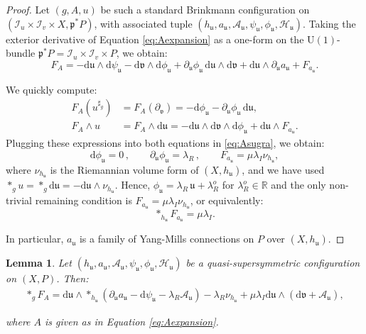 \documentclass[10pt,a4paper,twoside,reqno]{amsart}
\theoremstyle{plain}
\newtheorem{lemma}[thm]{Lemma}
\theoremstyle{definition}
\theoremstyle{remark}
\def\R{\mathbb{R}}
\def\dd{\mathrm{d}}
\def\cH{\mathcal{H}}
\def\U{\mathrm{U}}
\def\cA{\mathcal{A}}
\def\cI{\mathcal{I}}
\def\R{\mathbb{R}}
\def\cH{\mathcal{H}}
\def\dd{\mathrm{d}}
\def\fru{\mathfrak{u}}
\def\frv{\mathfrak{v}}
\begin{document}
\begin{proof}
Let $(g,A,u)$ be such a standard Brinkmann configuration on $(\cI_u\times \cI_v \times X, \mathfrak{p}^{\ast}P)$, with associated tuple $(h_{\fru}, a_{\fru}, \cA_{\fru}, \psi_{\fru}, \phi_{\fru}, \cH_{\fru})$. Taking the exterior derivative of Equation \eqref{eq:Aexpansion} as a one-form on the $\U(1)$-bundle $\mathfrak{p}^{\ast}P = \cI_u\times \cI_v \times P$, we obtain:
\begin{equation*}
F_A =  - \dd \fru \wedge \dd\psi_{\fru}  -  \dd \frv\wedge \dd\phi_{\fru} + \partial_{\fru} \phi_{\fru}\, \dd \fru\wedge  \dd \frv + \dd \fru \wedge \partial_{\fru} a_{\fru} + F_{a_{\fru}}.
\end{equation*}

\noindent
We quickly compute:
\begin{align*}
F_A(u^{\sharp_g}) &= F_A(\partial_{\frv}) = - \dd \phi_{\fru} - \partial_{\fru}\phi_{\fru} \, \dd \fru,\\
F_A \wedge u &= F_A\wedge \dd \fru = -\dd \fru\wedge \dd \frv \wedge \dd \phi_{\fru} + \dd \fru \wedge F_{a_{\fru}}.
\end{align*}
Plugging these expressions into both equations in \eqref{eq:Asugra}, we obtain:
\begin{equation*}
\dd \phi_{\fru} = 0\, , \qquad \partial_{\fru}\phi_{\fru} = \lambda_R\, , \qquad F_{a_{\fru}} = \mu \lambda_I \nu_{h_{\fru}},
\end{equation*}
where $\nu_{h_{\fru}}$ is the Riemannian volume form of $(X,h_{\fru})$, and we have used $\ast_g u = \ast_g \dd \fru = - \dd \fru \wedge \nu_{h_{\fru}}$. Hence, $\phi_{\fru} = \lambda_R \, \fru + \lambda_R^o$ for $\lambda_R^o\in\R$ and the only non-trivial remaining condition is $ F_{a_{\fru}} = \mu \lambda_I \nu_{h_{\fru}}$, or equivalently:
\begin{equation*}
\ast_{h_{\fru}} F_{a_{\fru}} = \mu \lambda_I.
\end{equation*}

\noindent
In particular, $a_{\fru}$ is a family of Yang-Mills connections on $P$ over $(X,h_{\fru})$.
\end{proof}

\begin{lemma}
Let $(h_{\fru}, a_{\fru},\cA_{\fru}, \psi_{\fru}, \phi_{\fru}, \cH_{\fru})$ be a quasi-supersymmetric configuration on $(X,P)$. Then:
\begin{eqnarray}
\label{eq:FAdual}
\ast_g F_A =  \dd \fru \wedge \ast_{h_{\fru}} (\partial_{\fru} a_{\fru} - \dd \psi_{\fru} - \lambda_R \cA_{\fru})  - \lambda_R \nu_{h_{\fru}} + \mu\lambda_I \dd \fru \wedge (\dd \frv + \cA_{\fru}),
\end{eqnarray}

\noindent
where $A$ is given as in Equation \eqref{eq:Aexpansion}. 
\end{lemma}
\end{document}

